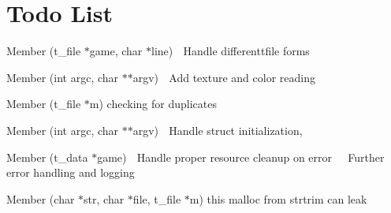 \chapter{Todo List}
\hypertarget{todo}{}\label{todo}

\begin{DoxyRefList}
\item[Member \doxylink{read__file_8c_a177dd88caa69e41813ba0007a39908f6}{add\+\_\+line} (t\+\_\+file \texorpdfstring{$\ast$}{*}game, char \texorpdfstring{$\ast$}{*}line)]\label{todo__todo000004}%
%
👾 Handle differenttfile forms  
\item[Member \doxylink{map__helpers_8c_a9572228285cd82518fa287634356ac30}{check\+\_\+args} (int argc, char \texorpdfstring{$\ast$}{*}\texorpdfstring{$\ast$}{*}argv)]\label{todo__todo000002}%
%
👾 Add texture and color reading


\item[Member \doxylink{player__verification_8c_a9673eac2437df9dc10edcd754f0e8cb2}{check\+\_\+player\+\_\+ns} (t\+\_\+file \texorpdfstring{$\ast$}{*}m)]\label{todo__todo000003}%
%
checking for duplicates  
\item[Member \doxylink{cub3d_8c_a3c04138a5bfe5d72780bb7e82a18e627}{main} (int argc, char \texorpdfstring{$\ast$}{*}\texorpdfstring{$\ast$}{*}argv)]\label{todo__todo000001}%
%
👾 Handle struct initialization,~\newline
  
\item[Member \doxylink{mlx__init__create__win_8c_a81e5bd795cb879b651de99812ac575da}{mlx\+\_\+init\+\_\+create\+\_\+window} (t\+\_\+data \texorpdfstring{$\ast$}{*}game)]\label{todo__todo000006}%
%
👾 Handle proper resource cleanup on error~\newline
 👾 Further error handling and logging  
\item[Member \doxylink{texture__parsing_8c_abf8e59e84a66365fba67d5449558b2b7}{texture\+\_\+save} (char \texorpdfstring{$\ast$}{*}str, char \texorpdfstring{$\ast$}{*}file, t\+\_\+file \texorpdfstring{$\ast$}{*}m)]\label{todo__todo000005}%
%
this malloc from strtrim can leak 
\end{DoxyRefList}